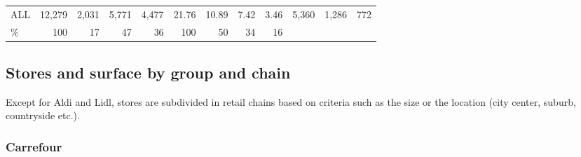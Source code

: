 \documentclass[11pt]{article}
\begin{document}
\begin{table}[H]
\begin{tabular}{l|rrrr|rrrr|rrr}
\midrule
ALL            &     12,279 &      2,031 &      5,771 &      4,477 &      21.76 &      10.89 &       7.42 &       3.46 &      5,360 &      1,286 &        772 \\
\%             &        100 &         17 &         47 &         36 &        100 &         50 &         34 &         16 &            &            &            \\
\bottomrule
\end{tabular}

\end{table}

\subsection{Stores and surface by group and chain}

Except for Aldi and Lidl, stores are subdivided in retail chains based on criteria such as the size or the location (city center, suburb, countryside etc.).

\subsubsection{Carrefour}
\end{document}
